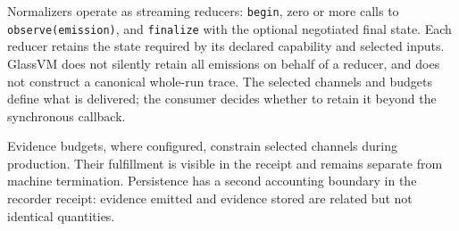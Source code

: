 Normalizers operate as streaming reducers: \texttt{begin}, zero or more calls
to \texttt{observe(emission)}, and \texttt{finalize} with the optional
negotiated final state. Each reducer retains the state required by its declared
capability and selected inputs. GlassVM does not silently retain all emissions
on behalf of a reducer, and does not construct a canonical whole-run trace.
The selected channels and budgets define what is delivered; the consumer
decides whether to retain it beyond the synchronous callback.

Evidence budgets, where configured, constrain selected channels during
production. Their fulfillment is visible in the receipt and remains separate
from machine termination. Persistence has a second accounting boundary in
the recorder receipt: evidence emitted and evidence stored are related but
not identical quantities.
